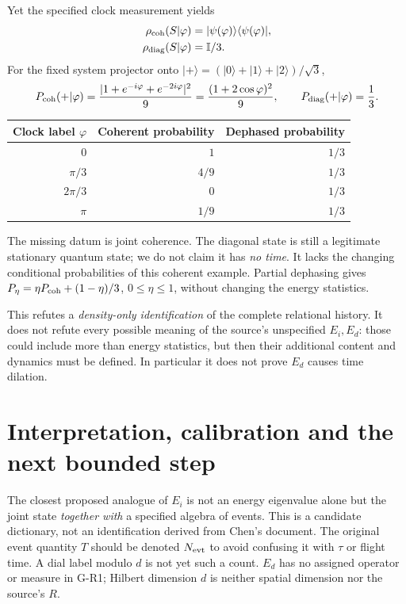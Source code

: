 \documentclass[11pt,a4paper]{article}
\newcommand{\id}{\mathbb I}
\newcommand{\ket}[1]{|#1\rangle}
\newcommand{\bra}[1]{\langle#1|}
\begin{document}
Yet the specified clock measurement yields
\begin{align}
 \rho_{\rm coh}(S|\varphi)&=\ket{\psi(\varphi)}\bra{\psi(\varphi)},\\
 \rho_{\rm diag}(S|\varphi)&=\id/3 .
\end{align}
For the fixed system projector onto
$\ket+=(\ket0+\ket1+\ket2)/\sqrt3$,
\begin{equation}\label{eq:counter}
 P_{\rm coh}(+|\varphi)=
   \frac{|1+e^{-i\varphi}+e^{-2i\varphi}|^2}{9}
   =\frac{(1+2\cos\varphi)^2}{9},\qquad
 P_{\rm diag}(+|\varphi)=\frac13 .
\end{equation}
\begin{center}
\begin{tabular}{rrr}
\toprule
Clock label $\varphi$ & Coherent probability & Dephased probability\\
\midrule
$0$       & $1$   & $1/3$\\
$\pi/3$   & $4/9$ & $1/3$\\
$2\pi/3$  & $0$   & $1/3$\\
$\pi$     & $1/9$ & $1/3$\\
\bottomrule
\end{tabular}
\end{center}
The missing datum is joint coherence. The diagonal state is still a
legitimate stationary quantum state; we do not claim it has \emph{no time}.
It lacks the changing conditional probabilities of this coherent
example. Partial dephasing gives
$P_\eta=\eta P_{\rm coh}+(1-\eta)/3$, $0\leq\eta\leq1$,
without changing the energy statistics.

This refutes a \emph{density-only identification} of the complete
relational history. It does not refute every possible meaning of the
source's unspecified $E_i,E_d$: those could include more than energy
statistics, but then their additional content and dynamics must be
defined. In particular it does not prove $E_d$ causes time dilation.

\newpage
\section{Interpretation, calibration and the next bounded step}
The closest proposed analogue of $E_i$ is not an energy eigenvalue alone
but the joint state \emph{together with} a specified algebra of events.
This is a candidate dictionary, not an identification derived from
Chen's document. The original event quantity $T$ should be denoted
$N_{\rm evt}$ to avoid confusing it with $\tau$ or flight time.
A dial label modulo $d$ is not yet such a count. $E_d$ has no assigned
operator or measure in G-R1; Hilbert dimension $d$ is neither spatial
dimension nor the source's $R$.
\end{document}
